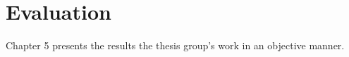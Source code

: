 \chapter{Evaluation}
\label{ch:evaluation}
Chapter 5 presents the results the thesis group's work in an objective manner.
